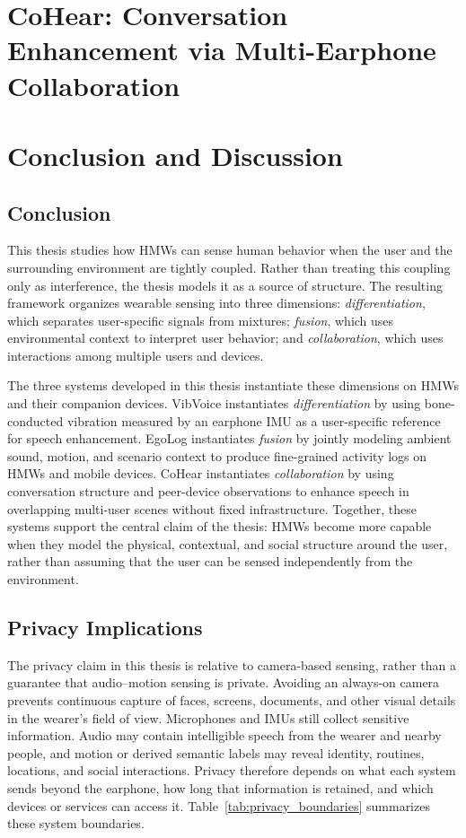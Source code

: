 \documentclass[11pt]{gsasthesis} %
\begin{document}
\chapter{CoHear: Conversation Enhancement via Multi-Earphone Collaboration}\label{ch:cohear}


\chapter{Conclusion and Discussion}\label{ch:conclusion}

\section{Conclusion}

This thesis studies how HMWs can sense human behavior when the user and the surrounding environment are tightly coupled. Rather than treating this coupling only as interference, the thesis models it as a source of structure. The resulting framework organizes wearable sensing into three dimensions: \textit{differentiation}, which separates user-specific signals from mixtures; \textit{fusion}, which uses environmental context to interpret user behavior; and \textit{collaboration}, which uses interactions among multiple users and devices.

The three systems developed in this thesis instantiate these dimensions on HMWs and their companion devices. VibVoice instantiates \textit{differentiation} by using bone-conducted vibration measured by an earphone IMU as a user-specific reference for speech enhancement. EgoLog instantiates \textit{fusion} by jointly modeling ambient sound, motion, and scenario context to produce fine-grained activity logs on HMWs and mobile devices. CoHear instantiates \textit{collaboration} by using conversation structure and peer-device observations to enhance speech in overlapping multi-user scenes without fixed infrastructure. Together, these systems support the central claim of the thesis: HMWs become more capable when they model the physical, contextual, and social structure around the user, rather than assuming that the user can be sensed independently from the environment.

\section{Privacy Implications}
\label{sec:thesis_privacy}

The privacy claim in this thesis is relative to camera-based sensing, rather than a guarantee that audio--motion sensing is private. Avoiding an always-on camera prevents continuous capture of faces, screens, documents, and other visual details in the wearer's field of view. Microphones and IMUs still collect sensitive information. Audio may contain intelligible speech from the wearer and nearby people, and motion or derived semantic labels may reveal identity, routines, locations, and social interactions. Privacy therefore depends on what each system sends beyond the earphone, how long that information is retained, and which devices or services can access it. Table~\ref{tab:privacy_boundaries} summarizes these system boundaries.
\end{document}
